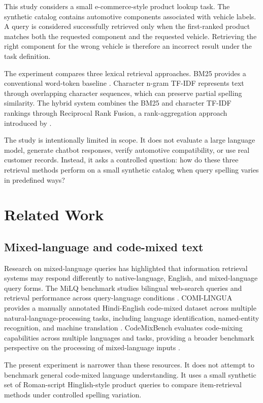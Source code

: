 \documentclass[11pt,a4paper]{article}
\begin{document}
This study considers a small e-commerce-style product lookup task. The synthetic catalog contains automotive components associated with vehicle labels. A query is considered successfully retrieved only when the first-ranked product matches both the requested component and the requested vehicle. Retrieving the right component for the wrong vehicle is therefore an incorrect result under the task definition.

The experiment compares three lexical retrieval approaches. BM25 provides a conventional word-token baseline \citep{robertson1995okapi}. Character n-gram TF-IDF represents text through overlapping character sequences, which can preserve partial spelling similarity. The hybrid system combines the BM25 and character TF-IDF rankings through Reciprocal Rank Fusion, a rank-aggregation approach introduced by \citet{cormack2009rrf}.

The study is intentionally limited in scope. It does not evaluate a large language model, generate chatbot responses, verify automotive compatibility, or use real customer records. Instead, it asks a controlled question: how do these three retrieval methods perform on a small synthetic catalog when query spelling varies in predefined ways?

\section{Related Work}
\subsection{Mixed-language and code-mixed text}
Research on mixed-language queries has highlighted that information retrieval systems may respond differently to native-language, English, and mixed-language query forms. The MiLQ benchmark studies bilingual web-search queries and retrieval performance across query-language conditions \citep{kim2025milq}. COMI-LINGUA provides a manually annotated Hindi-English code-mixed dataset across multiple natural-language-processing tasks, including language identification, named-entity recognition, and machine translation \citep{sheth2025comi}. CodeMixBench evaluates code-mixing capabilities across multiple languages and tasks, providing a broader benchmark perspective on the processing of mixed-language inputs \citep{yang2025codemixbench}.

The present experiment is narrower than these resources. It does not attempt to benchmark general code-mixed language understanding. It uses a small synthetic set of Roman-script Hinglish-style product queries to compare item-retrieval methods under controlled spelling variation.
\end{document}
